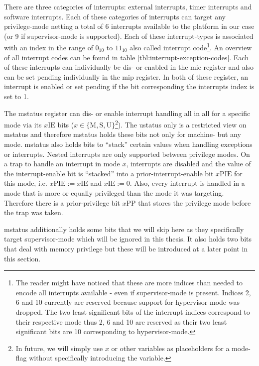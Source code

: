 There are three categories of interrupts: external interrupts, timer interrupts and software interrupts.
Each of these categories of interrupts can target any privilege-mode netting a total of 6 interrupts available to the platform in our case (or 9 if supervisor-mode is supported).
Each of these interrupt-types is associated with an index in the range of $ 0_{10} $ to $ 11_{10} $ also called interrupt code\footnote{%
    The reader might have noticed that these are more indices than needed to encode all interrupts available - even if supervisor-mode is present.
    Indices 2, 6 and 10 currently are reserved because support for hypervisor-mode was dropped.
    The two least significant bits of the interrupt indices correspond to their respective mode thus 2, 6 and 10 are reserved as their two least significant bits are 10 corresponding to hypervisor-mode.
}.
An overview of all interrupt codes can be found in table \ref{tbl:interrupt-exception-codes}.
Each of these interrupts can individually be dis- or enabled in the \gls{mie} register and also can be set pending individually in the \gls{mip} register.
In both of these register, an interrupt is enabled or set pending if the bit corresponding the interrupts index is set to 1.

The \gls{mstatus} register can dis- or enable interrupt handling all in all for a specific mode via its $ x\text{IE} $ bits ($ x \in \{ \text{M}, \text{S}, \text{U}\} $\footnote{%
    In future, we will simply use $ x $ or other variables as placeholders for a mode-flag without specifically introducing the variable.
}).
The \gls{ustatus} only is a restricted view on \gls{mstatus} and therefore \gls{mstatus} holds these bits not only for machine- but any mode.
\gls{mstatus} also holds bits to \enquote{stack} certain values when handling exceptions or interrupts.
Nested interrupts are only supported between privilege modes.
On a trap to handle an interrupt in mode $ x $, interrupts are disabled and the value of the interrupt-enable bit is \enquote{stacked} into a prior-interrupt-enable bit $x\text{PIE} $ for this mode, i.e. $ x\text{PIE} := x\text{IE} $ and $ x\text{IE} := 0 $.
Also, every interrupt is handled in a mode that is more or equally privileged than the mode it was targeting.
Therefore there is a prior-privilege bit $ x\text{PP} $ that stores the privilege mode before the trap was taken.

\gls{mstatus} additionally holds some bits that we will skip here as they specifically target supervisor-mode which will be ignored in this thesis.
It also holds two bits that deal with memory privilege but these will be introduced at a later point in this section.

